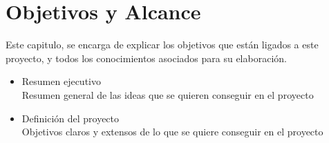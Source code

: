 \chapter{Objetivos y Alcance}\label{oya}

\thispagestyle{fancy}


Este capitulo, se encarga de explicar los objetivos que están ligados a este proyecto, y todos los conocimientos asociados para su elaboración.

\begin{itemize}
    \item Resumen ejecutivo\\Resumen general de las ideas que se quieren conseguir en el proyecto
    \item Definición del proyecto\\Objetivos claros y extensos de lo que se quiere conseguir en el proyecto
\end{itemize}

